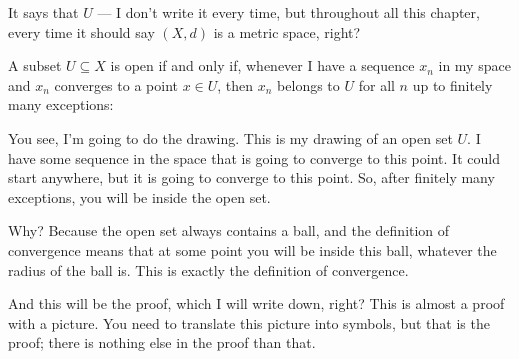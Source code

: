 \begin{speech}[00:36:04 - 00:37:39]
It says that $U$ --- I don't write it every time, but throughout all this chapter, every time it should say $(X, d)$ is a metric space, right? 

A subset $U \subseteq X$ is open if and only if, whenever I have a sequence $x_n$ in my space and $x_n$ converges to a point $x \in U$, then $x_n$ belongs to $U$ for all $n$ up to finitely many exceptions: 
\end{speech}

\begin{content}
\end{content}

\begin{speech}[00:37:39 - 00:38:59]
You see, I'm going to do the drawing.  This is my drawing of an open set $U$. I have some sequence in the space that is going to converge to this point. It could start anywhere, but it is going to converge to this point. So, after finitely many exceptions, you will be inside the open set.

Why? Because the open set always contains a ball, and the definition of convergence means that at some point you will be inside this ball, whatever the radius of the ball is. This is exactly the definition of convergence.

And this will be the proof, which I will write down, right? This is almost a proof with a picture. You need to translate this picture into symbols, but that is the proof; there is nothing else in the proof than that.
\end{speech}

